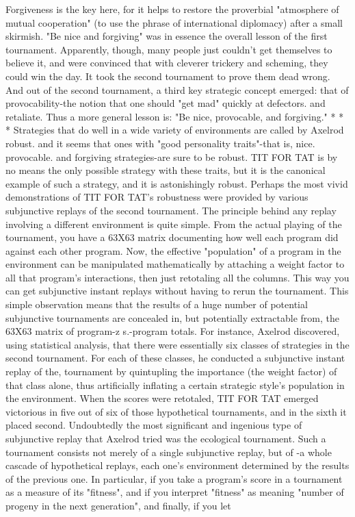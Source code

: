 Forgiveness is the key here, for it helps to restore the proverbial "atmosphere of mutual
cooperation" (to use the phrase of international diplomacy) after a small skirmish.
        "Be nice and forgiving" was in essence the overall lesson of the first tournament.
Apparently, though, many people just couldn't get themselves to believe it, and were
convinced that with cleverer trickery and scheming, they could win the day. It took the
second tournament to prove them dead wrong. And out of the second tournament, a third
key strategic concept emerged: that of provocability-the notion that one should "get mad"
quickly at defectors. and retaliate. Thus a more general lesson is: "Be nice, provocable,
and forgiving."
                                           *       *       *
        Strategies that do well in a wide variety of environments are called by Axelrod
robust. and it seems that ones with "good personality traits"-that is, nice. provocable. and
forgiving strategies-are sure to be robust. TIT FOR TAT is by no means the only possible
strategy with these traits, but it is the canonical example of such a strategy, and it is
astonishingly robust.
        Perhaps the most vivid demonstrations of TIT FOR TAT's robustness were
provided by various subjunctive replays of the second tournament. The principle behind
any replay involving a different environment is quite simple. From the actual playing of
the tournament, you have a 63X63 matrix documenting how well each program did
against each other program. Now, the effective "population" of a program in the
environment can be manipulated mathematically by attaching a weight factor to all that
program's interactions, then just retotaling all the columns. This way you can get
subjunctive instant replays without having to rerun the tournament.
        This simple observation means that the results of a huge number of potential
subjunctive tournaments are concealed in, but potentially extractable from, the 63X63
matrix of program-z s.-program totals. For instance, Axelrod discovered, using statistical
analysis, that there were essentially six classes of strategies in the second tournament. For
each of these classes, he conducted a subjunctive instant replay of the, tournament by
quintupling the importance (the weight factor) of that class alone, thus artificially
inflating a certain strategic style's population in the environment. When the scores were
retotaled, TIT FOR TAT emerged victorious in five out of six of those hypothetical
tournaments, and in the sixth it placed second.
        Undoubtedly the most significant and ingenious type of subjunctive replay that
Axelrod tried was the ecological tournament. Such a tournament consists not merely of a
single subjunctive replay, but of -a whole cascade of hypothetical replays, each one's
environment determined by the results of the previous one. In particular, if you take a
program's score in a tournament as a measure of its "fitness", and if you interpret
"fitness" as meaning "number of progeny in the next generation", and finally, if you let




